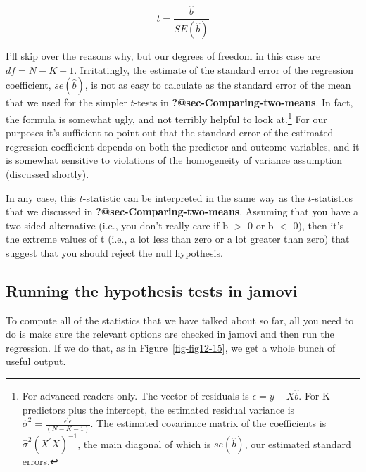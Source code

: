 \documentclass[
  a4paper,
]{book}
\begin{document}
\[t=\frac{\hat{b}}{SE(\hat{b})}\]

I'll skip over the reasons why, but our degrees of freedom in this case
are \(df = N - K - 1\). Irritatingly, the estimate of the standard error
of the regression coefficient, \(se(\hat{b})\), is not as easy to
calculate as the standard error of the mean that we used for the simpler
\(t\)-tests in \textbf{?@sec-Comparing-two-means}. In fact, the formula
is somewhat ugly, and not terribly helpful to look at.\footnote{For
  advanced readers only. The vector of residuals is
  \(\epsilon=y - X\hat{b}\). For K predictors plus the intercept, the
  estimated residual variance is
  \(\hat{\sigma}^2 = \frac{\epsilon^{'}\epsilon}{(N - K - 1)}\). The
  estimated covariance matrix of the coefficients is
  \(\hat{\sigma}^{2}(X^{'}X)^{-1}\), the main diagonal of which is
  \(se(\hat{b})\), our estimated standard errors.} For our purposes it's
sufficient to point out that the standard error of the estimated
regression coefficient depends on both the predictor and outcome
variables, and it is somewhat sensitive to violations of the homogeneity
of variance assumption (discussed shortly).

In any case, this \(t\)-statistic can be interpreted in the same way as
the \(t\)-statistics that we discussed in
\textbf{?@sec-Comparing-two-means}. Assuming that you have a two-sided
alternative (i.e., you don't really care if b \(>\) 0 or b \(<\) 0),
then it's the extreme values of t (i.e., a lot less than zero or a lot
greater than zero) that suggest that you should reject the null
hypothesis.

\hypertarget{running-the-hypothesis-tests-in-jamovi}{%
\subsection{Running the hypothesis tests in
jamovi}\label{running-the-hypothesis-tests-in-jamovi}}

To compute all of the statistics that we have talked about so far, all
you need to do is make sure the relevant options are checked in jamovi
and then run the regression. If we do that, as in
Figure~\ref{fig-fig12-15}, we get a whole bunch of useful output.
\end{document}

